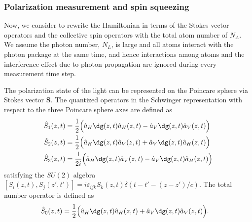 \documentclass[]{report}
\begin{document}
\subsubsection{Polarization measurement and spin squeezing}

Now, we consider to rewrite the Hamiltonian in terms of the Stokes vector operators and the collective spin operators with the total atom number of $ N_A $. We assume the photon number, $ N_L $, is large and all atoms interact with the photon package at the same time, and hence interactions among atoms and the interference effect due to photon propagation are ignored during every measurement time step. 

The polarization state of the light can be represented on the Poincare sphere via Stokes vector $ \mathbf{S} $. The quantized operators in the Schwinger representation with respect to the three Poincare sphere axes are defined as  
\begin{align}
\hat{S}_1(z,t)&= \frac{1}{2} \Big( \hat{a}_H\dg(z,t) \hat{a}_H(z,t) -  \hat{a}_V\dg(z,t) \hat{a}_V(z,t) \Big) \\
\hat{S}_2(z,t)&= \frac{1}{2} \Big( \hat{a}_H\dg(z,t) \hat{a}_V(z,t) +  \hat{a}_V\dg(z,t) \hat{a}_H(z,t) \Big)\\
\hat{S}_3(z,t)&= \frac{1}{2i} \Big( \hat{a}_H\dg(z,t) \hat{a}_V(z,t) -  \hat{a}_V\dg(z,t) \hat{a}_H(z,t) \Big)
\end{align}
satisfying the $ SU(2) $ algebra $ [S_i(z,t),S_j(z',t')]=i\varepsilon_{ijk}S_k(z,t)\delta (t-t' - (z-z')/c ) $. The total number operator is defined as
\begin{align}
\hat{S}_0(z,t)&= \frac{1}{2} \Big( \hat{a}_H\dg(z,t) \hat{a}_H(z,t) +  \hat{a}_V\dg(z,t) \hat{a}_V(z,t) \Big).
\end{align}
\end{document}
